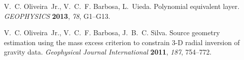 \begin{thebibliography}{10}
V.~C. Oliveira~Jr., V.~C.~F. Barbosa, L.~Uieda. Polynomial equivalent layer.
  \emph{GEOPHYSICS} \textbf{2013}, \emph{78}, G1--G13.

V.~C. Oliveira~Jr., V.~C.~F. Barbosa, J.~B.~C. Silva. Source geometry
  estimation using the mass excess criterion to constrain 3-{D} radial
  inversion of gravity data. \emph{Geophysical Journal International}
  \textbf{2011}, \emph{187}, 754--772.

\end{thebibliography}

